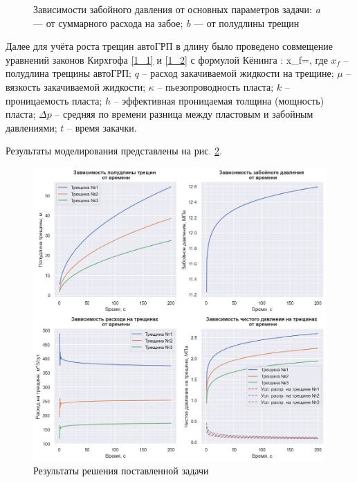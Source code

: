 \begin{figure}[H]
\begin{subfigure}[t]{\dimexpr.5\linewidth-1.3em\relax}
	\end{subfigure}
\captionsetup{justification=centering} %
\caption{Зависимости забойного давления от основных параметров задачи: {\itshape a} --- от суммарного расхода на забое; {\itshape b} --- от полудлины трещин} 
\label{fig:results1}
\end{figure}

Далее для учёта роста трещин автоГРП в длину было проведено совмещение уравнений законов Кирхгофа \eqref{1_1} и \eqref{1_2} с формулой Кёнинга \cite{koning}:
\beq
x_f=,
\eeq
где $x_f$ -- полудлина трещины автоГРП;\newline
$q$ -- расход закачиваемой жидкости на трещине;\newline
$\mu$ -- вязкость закачиваемой жидкости;\newline
$\kappa$ -- пьезопроводность пласта;\newline
$k$ -- проницаемость пласта;\newline
$h$ -- эффективная проницаемая толщина (мощность) пласта;\newline
$\Delta p$ -- средняя по времени разница между пластовым и забойным давлениями;\newline
$t$ -- время закачки.

Результаты моделирования представлены на рис. \ref{fig:results2}.
 
\begin{figure}[H] 
\center
\includegraphics[width=\linewidth]{images/Kirchhoff+Koning.png}
\caption{Результаты решения поставленной задачи} 
\label{fig:results2}  
\end{figure}

